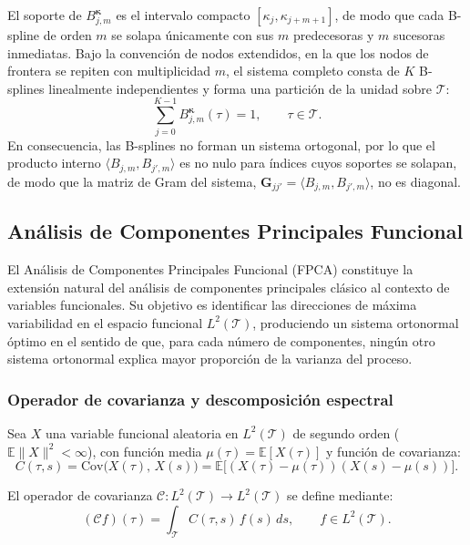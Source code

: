 El soporte de $B_{j,m}^{\boldsymbol{\kappa}}$ es el intervalo compacto $[\kappa_j, \kappa_{j+m+1}]$, de modo que cada B-spline de orden $m$ se solapa únicamente con sus $m$ predecesoras y $m$ sucesoras inmediatas. Bajo la convención de nodos extendidos, en la que los nodos de frontera se repiten con multiplicidad $m$, el sistema completo consta de $K$ B-splines linealmente independientes y forma una partición de la unidad sobre $\mathcal{T}$:
\begin{equation}
    \sum_{j=0}^{K-1} B_{j,m}^{\boldsymbol{\kappa}}(\tau) = 1,
    \qquad \tau \in \mathcal{T}.
\end{equation}
En consecuencia, las B-splines no forman un sistema ortogonal, por lo que el producto interno $\langle B_{j,m}, B_{j',m}\rangle$ es no nulo para índices cuyos soportes se solapan, de modo que la matriz de Gram del sistema, $\mathbf{G}_{jj'} = \langle B_{j,m}, B_{j',m}\rangle$, no es diagonal.

\subsection{Análisis de Componentes Principales Funcional}
\label{02_01_04_fpca}
El Análisis de Componentes Principales Funcional (FPCA) constituye la extensión natural del análisis de componentes principales clásico al contexto de variables funcionales. Su objetivo es identificar las direcciones de máxima variabilidad en el espacio funcional $L^2(\mathcal{T})$, produciendo un sistema ortonormal óptimo en el sentido de que, para cada número de componentes, ningún otro sistema ortonormal explica mayor proporción de la varianza del proceso.

\subsubsection{Operador de covarianza y descomposición espectral}
\label{02_01_04_01_operador_covarianza}
Sea $X$ una variable funcional aleatoria en $L^2(\mathcal{T})$ de segundo orden ($\mathbb{E}\|X\|^2 < \infty$), con función media $\mu(\tau) = \mathbb{E}[X(\tau)]$ y función de covarianza:
\begin{equation}
    C(\tau, s) = \mathrm{Cov}\bigl(X(\tau),\, X(s)\bigr)
    = \mathbb{E}\bigl[(X(\tau) - \mu(\tau))
    (X(s) - \mu(s))\bigr].
\end{equation}

El operador de covarianza $\mathcal{C}: L^2(\mathcal{T}) \to L^2(\mathcal{T})$ se define mediante:
\begin{equation}
    (\mathcal{C} f)(\tau) = \int_{\mathcal{T}} C(\tau, s)\, f(s)\, ds,
    \qquad f \in L^2(\mathcal{T}).
\end{equation}

